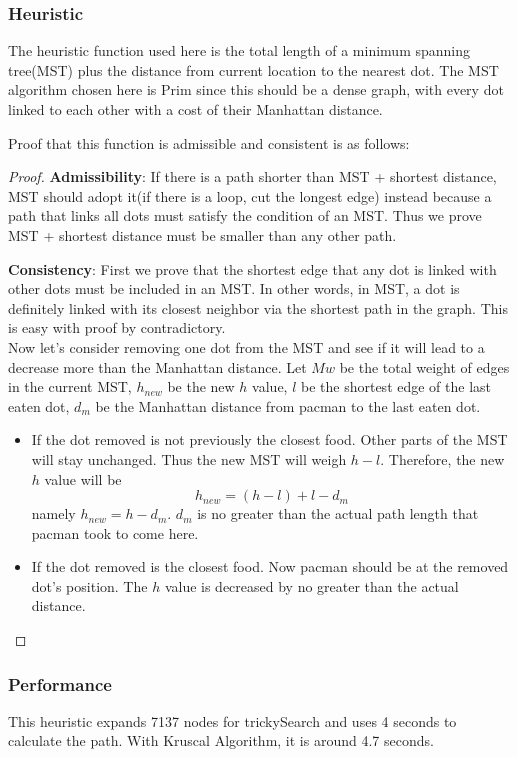 \documentclass{article}
\begin{document}
    \subsubsection{Heuristic}
    The heuristic function used here is the total length of a minimum spanning tree(MST) plus the distance from current location to the nearest dot. The MST algorithm chosen here is Prim since this should be a dense graph, with every dot linked to each other with a cost of their Manhattan distance.\par
    Proof that this function is admissible and consistent is as follows:
    \begin{proof}
    \textbf{Admissibility}: If there is a path shorter than MST + shortest distance, MST should adopt it(if there is a loop, cut the longest edge) instead because a path that links all dots must satisfy the condition of an MST. Thus we prove MST + shortest distance must be smaller than any other path.\par
    \textbf{Consistency}: First we prove that the shortest edge that any dot is linked with other dots must be included in an MST. In other words, in MST, a dot is definitely linked with its closest neighbor via the shortest path in the graph. This is easy with proof by contradictory.\\ Now let's consider removing one dot from the MST and see if it will lead to a decrease more than the Manhattan distance. Let $Mw$ be the total weight of edges in the current MST, $h_{new}$ be the new $h$ value, $l$ be the shortest edge of the last eaten dot, $d_m$ be the Manhattan distance from pacman to the last eaten dot.
        \begin{itemize}
          \item If the dot removed is not previously the closest food. Other parts of the MST will stay unchanged. Thus the new MST will weigh $h - l$. Therefore, the new $h$ value will be 
              $$h_{new} = (h - l) + l - d_m $$ namely $h_{new} = h - d_m$. $d_m$ is no greater than the actual path length that pacman took to come here.
          \item If the dot removed is the closest food. Now pacman should be at the removed dot's position. The $h$ value is decreased by no greater than the actual distance.
        \end{itemize}
      \end{proof}
    \subsubsection{Performance}
    This heuristic expands 7137 nodes for trickySearch and uses 4 seconds to calculate the path. With Kruscal Algorithm, it is around 4.7 seconds.
\end{document}
